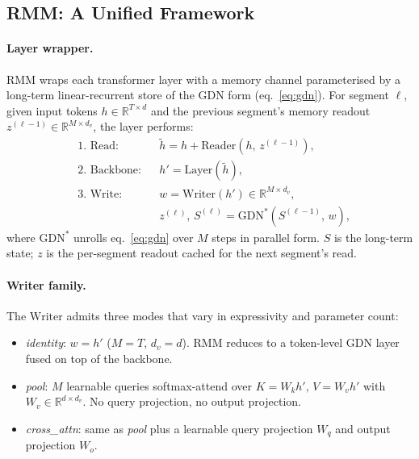 \documentclass[11pt]{article}
\begin{document}
\subsection{RMM: A Unified Framework}
\label{sec:rmm}

\paragraph{Layer wrapper.} RMM wraps each transformer layer with a memory channel parameterised by a long-term linear-recurrent store of the GDN form (eq.~\ref{eq:gdn}). For segment $\ell$, given input tokens $h \in \mathbb{R}^{T \times d}$ and the previous segment's memory readout $z^{(\ell-1)} \in \mathbb{R}^{M \times d_v}$, the layer performs:
\begin{align}
    &\text{1.\ Read:}    && \tilde h = h + \mathrm{Reader}(h,\, z^{(\ell-1)}), \\
    &\text{2.\ Backbone:}&& h' = \mathrm{Layer}(\tilde h), \\
    &\text{3.\ Write:}   && w = \mathrm{Writer}(h') \in \mathbb{R}^{M \times d_v}, \\
    &                    && z^{(\ell)},\, S^{(\ell)} = \mathrm{GDN}^*(S^{(\ell-1)},\, w),
\end{align}
where $\mathrm{GDN}^*$ unrolls eq.~\eqref{eq:gdn} over $M$ steps in parallel form. $S$ is the long-term state; $z$ is the per-segment readout cached for the next segment's read.

\paragraph{Writer family.} The $\mathrm{Writer}$ admits three modes that vary in expressivity and parameter count:
\begin{itemize}
    \item \emph{identity}: $w = h'$ ($M{=}T$, $d_v{=}d$). RMM reduces to a token-level GDN layer fused on top of the backbone.
    \item \emph{pool}: $M$ learnable queries softmax-attend over $K{=}W_k h',\, V{=}W_v h'$ with $W_v \!\in\! \mathbb{R}^{d \times d_v}$. No query projection, no output projection.
    \item \emph{cross\_attn}: same as \emph{pool} plus a learnable query projection $W_q$ and output projection $W_o$.
\end{itemize}
\end{document}
